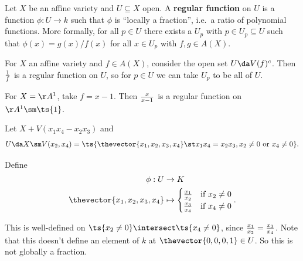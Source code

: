 \begin{definition}[?]

Let \(X\) be an affine variety and \(U\subseteq X\) open. A
\textbf{regular function} on \(U\) is a function \(\phi: U\to k\) such
that \(\phi\) is ``locally a fraction'', i.e.~a ratio of polynomial
functions. More formally, for all \(p\in U\) there exists a \(U_p\) with
\(p\in U_p \subseteq U\) such that \(\phi(x) = g(x)/ f(x)\) for all
\(x\in U_p\) with \(f, g\in A(X)\).

\end{definition}

\begin{example}

For \(X\) an affine variety and \(f\in A(X)\), consider the open set
\(U\da V(f)^c\). Then \({1\over f}\) is a regular function on \(U\), so
for \(p\in U\) we can take \(U_p\) to be all of \(U\).

\end{example}

\begin{example}

For \(X = \AA^1\), take \(f=x-1\). Then \({x\over x-1}\) is a regular
function on \(\AA^1 \sm\ts{1}\).

\end{example}

\begin{example}

Let \(X + V(x_1 x_4 - x_2 x_3)\) and
\begin{align*}  
U \da X\sm V(x_2, x_4) = \ts{\thevector{x_1, x_2, x_3, x_4} \st x_1 x_4 = x_2 x_3, x_2\neq 0 \text{ or } x_4\neq 0 }
.\end{align*}

Define
\begin{align*}  
\phi: U &\to K \\
\thevector{x_1, x_2, x_3, x_4} &\mapsto
\begin{cases}
{x_1\over x_2} & \text{if } x_2 \neq 0 \\
{x_3\over x_4} & \text{if } x_4 \neq 0
\end{cases}
.\end{align*}

This is well-defined on \(\ts{x_2\neq 0} \intersect \ts{x_4 \neq 0}\),
since \({x_1\over x_2} = {x_3 \over x_4}\). Note that this doesn't
define an element of \(k\) at \(\thevector{0,0,0,1}\in U\). So this is
not globally a fraction.

\end{example}

